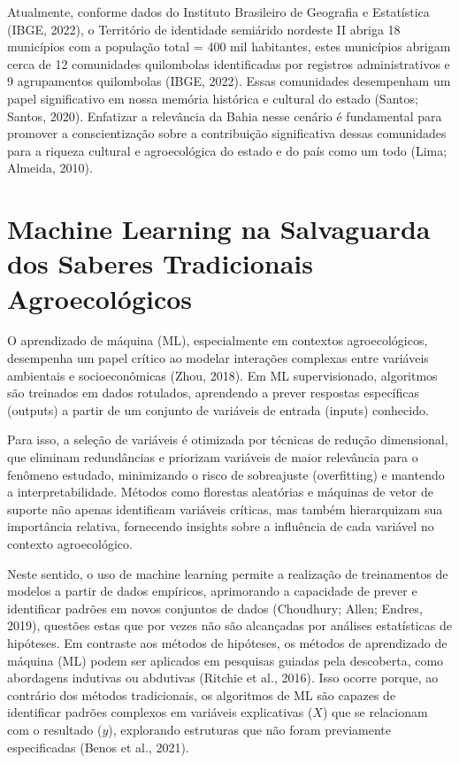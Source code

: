 Atualmente, conforme dados do Instituto Brasileiro de Geografia e Estatística (IBGE, 2022), o Território de identidade semiárido nordeste II abriga 18 municípios com a população total = 400 mil habitantes, estes municípios abrigam cerca de 12 comunidades quilombolas identificadas por registros administrativos e 9 agrupamentos quilombolas (IBGE, 2022). Essas comunidades desempenham um papel significativo em nossa memória histórica e cultural do estado (Santos; Santos, 2020). Enfatizar a relevância da Bahia nesse cenário é fundamental para promover a conscientização sobre a contribuição significativa dessas comunidades para a riqueza cultural e agroecológica do estado e do país como um todo (Lima; Almeida, 2010).


\section{Machine Learning na Salvaguarda dos Saberes Tradicionais Agroecológicos}

O aprendizado de máquina (ML), especialmente em contextos agroecológicos, desempenha um papel crítico ao modelar interações complexas entre variáveis ambientais e socioeconômicas (Zhou, 2018). Em ML supervisionado, algoritmos são treinados em dados rotulados, aprendendo a prever respostas específicas (outputs) a partir de um conjunto de variáveis de entrada (inputs) conhecido. 

Para isso, a seleção de variáveis é otimizada por técnicas de redução dimensional, que eliminam redundâncias e priorizam variáveis de maior relevância para o fenômeno estudado, minimizando o risco de sobreajuste (overfitting) e mantendo a interpretabilidade. Métodos como florestas aleatórias e máquinas de vetor de suporte não apenas identificam variáveis críticas, mas também hierarquizam sua importância relativa, fornecendo insights sobre a influência de cada variável no contexto agroecológico.

Neste sentido, o uso de machine learning permite a realização de treinamentos de modelos a partir de dados empíricos, aprimorando a capacidade de prever e identificar padrões em novos conjuntos de dados (Choudhury; Allen; Endres, 2019), questões estas que por vezes não são alcançadas por análises estatísticas de hipóteses. 
Em contraste aos métodos de hipóteses, os métodos de aprendizado de máquina (ML) podem ser aplicados em pesquisas guiadas pela descoberta, como abordagens indutivas ou abdutivas (Ritchie et al., 2016). Isso ocorre porque, ao contrário dos métodos tradicionais, os algoritmos de ML são capazes de identificar padrões complexos em variáveis explicativas ($X$) que se relacionam com o resultado ($y$), explorando estruturas que não foram previamente especificadas (Benos et al., 2021). 

